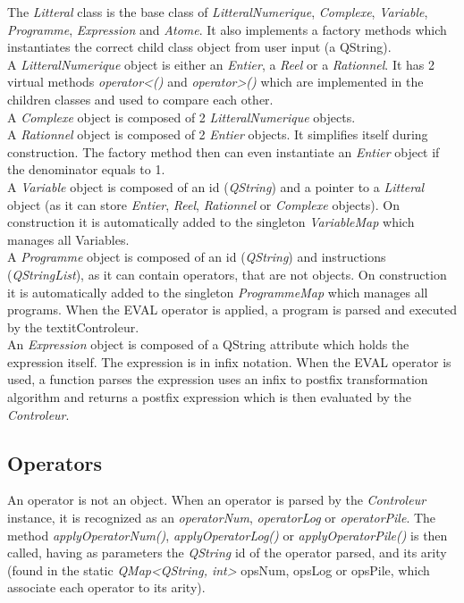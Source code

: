 \documentclass[titlepage]{article}
\begin{document}
    The \textit{Litteral} class is the base class of \textit{LitteralNumerique}, \textit{Complexe}, \textit{Variable}, \textit{Programme}, \textit{Expression} and \textit{Atome}. It also implements a factory methods which instantiates the correct child class object from user input (a QString). \\
    A \textit{LitteralNumerique} object is either an \textit{Entier}, a \textit{Reel} or a \textit{Rationnel}. It has 2 virtual methods \textit{operator<()} and \textit{operator>()} which are implemented in the children classes and used to compare each other.\\
    A \textit{Complexe} object is composed of 2 \textit{LitteralNumerique} objects.\\
    A \textit{Rationnel} object is composed of 2 \textit{Entier} objects. It simplifies itself during construction. The factory method then can even instantiate an \textit{Entier} object if the denominator equals to 1.\\
    A \textit{Variable} object is composed of an id (\textit{QString}) and a pointer to a \textit{Litteral} object (as it can store \textit{Entier}, \textit{Reel}, \textit{Rationnel} or \textit{Complexe} objects). On construction it is automatically added to the singleton \textit{VariableMap} which manages all Variables. \\
    A \textit{Programme} object is composed of an id (\textit{QString}) and instructions (\textit{QStringList}), as it can contain operators, that are not objects. On construction it is automatically added to the singleton \textit{ProgrammeMap} which manages all programs. When the EVAL operator is applied, a program is parsed and executed by the textit{Controleur}.\\
    An \textit{Expression} object is composed of a QString attribute which holds the expression itself. The expression is in infix notation. When the EVAL operator is used, a function parses the expression uses an infix to postfix transformation algorithm and returns a postfix expression which is then evaluated by the \textit{Controleur}.\\ 
    

    \subsection{Operators}

    An operator is not an object. When an operator is parsed by the \textit{Controleur} instance, it is recognized as an \textit{operatorNum}, \textit{operatorLog} or \textit{operatorPile}. The method \textit{applyOperatorNum()}, \textit{applyOperatorLog()} or \textit{applyOperatorPile()} is then called, having as parameters the \textit{QString} id of the operator parsed, and its arity (found in the static \textit{QMap<QString, int>} opsNum, opsLog or opsPile, which associate each operator to its arity).\\
\end{document}
